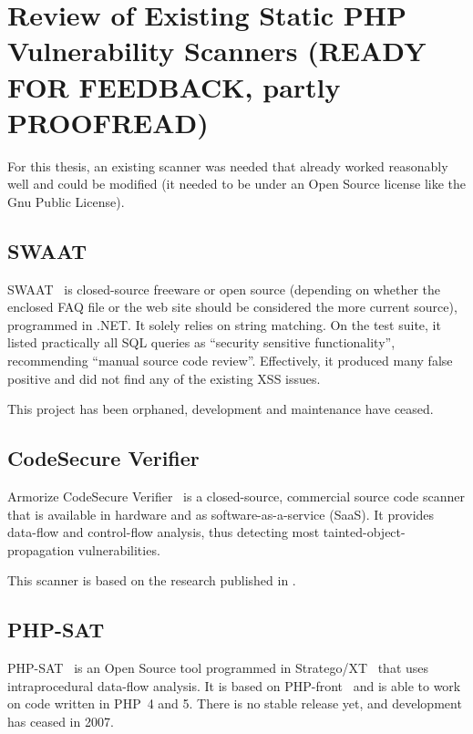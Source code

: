 \chapter{Review of Existing Static PHP Vulnerability Scanners (READY FOR FEEDBACK, partly PROOFREAD)}
\label{scanners}

For this thesis, an existing scanner was needed that already worked reasonably well and could be modified (\ie it needed to be under an Open Source license like the Gnu Public License).



\section{SWAAT}
\label{swaat}
SWAAT~\cite{swaat} is closed-source freeware or open source (depending on whether the enclosed FAQ file or the web site should be considered the more current source), programmed in .NET. It solely relies on string matching. On the test suite, it listed practically all SQL queries as ``security sensitive functionality'', recommending ``manual source code review''. Effectively, it produced many false positive and did not find any of the existing XSS issues.

This project has been orphaned, \ie development and maintenance have ceased.

\section{CodeSecure Verifier}
\label{armorize}
Armorize CodeSecure Verifier~\cite{codesecure, verifier} is a closed-source, commercial source code scanner that is available in hardware and as software-as-a-service (SaaS). It provides data-flow and control-flow analysis, thus detecting most tainted-object-propagation vulnerabilities.

This scanner is based on the research published in \cite{huang-securing}.

\section{PHP-SAT}
\label{php-sat}
PHP-SAT~\cite{php-sat} is an Open Source tool programmed in Stratego/XT~\cite{stratego} that uses intraprocedural data-flow analysis. It is based on PHP-front~\cite{php-front} and is able to work on code written in PHP~4 and 5. There is no stable release yet, and development has ceased in 2007.

